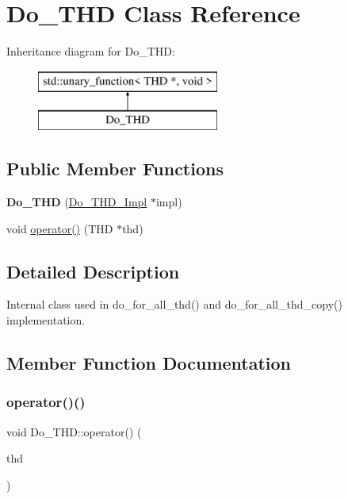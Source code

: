 \hypertarget{classDo__THD}{}\section{Do\+\_\+\+T\+HD Class Reference}
\label{classDo__THD}
Inheritance diagram for Do\+\_\+\+T\+HD\+:\begin{figure}[H]
\begin{center}
\leavevmode
\includegraphics[height=2.000000cm]{classDo__THD}
\end{center}
\end{figure}
\subsection*{Public Member Functions}
\begin{DoxyCompactItemize}
\item 
\mbox{\label{classDo__THD_ab091e518bcef8f6bb25a6ae10ed1c353}} 
{\bfseries Do\+\_\+\+T\+HD} (\mbox{\hyperlink{classDo__THD__Impl}{Do\+\_\+\+T\+H\+D\+\_\+\+Impl}} $\ast$impl)
\item 
void \mbox{\hyperlink{classDo__THD_ad3679dfb66f873977327474d1fab632b}{operator()}} (T\+HD $\ast$thd)
\end{DoxyCompactItemize}


\subsection{Detailed Description}
Internal class used in do\+\_\+for\+\_\+all\+\_\+thd() and do\+\_\+for\+\_\+all\+\_\+thd\+\_\+copy() implementation. 

\subsection{Member Function Documentation}
\mbox{\label{classDo__THD_ad3679dfb66f873977327474d1fab632b}} 
\subsubsection{\texorpdfstring{operator()()}{operator()()}}
{\footnotesize\ttfamily void Do\+\_\+\+T\+H\+D\+::operator() (\begin{DoxyParamCaption}\item[{T\+HD $\ast$}]{thd }\end{DoxyParamCaption})\hspace{0.3cm}{\ttfamily [inline]}}

